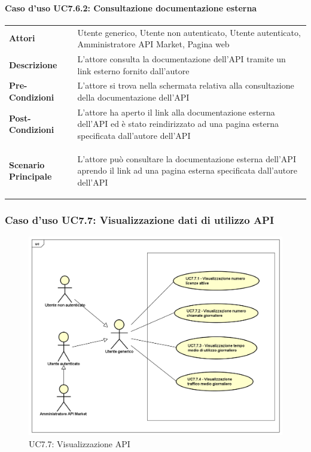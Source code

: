 \paragraph{Caso d'uso UC7.6.2: Consultazione documentazione esterna}
\label{UC7_6_2}

\begin{minipage}{\linewidth}
	\begin{tabular}{ l | p{11cm}}
		\hline
		\rowcolor{Gray}
		\multicolumn{2}{c}{UC7.6.2 - Consultazione documentazione esterna} \\
		\hline
		\textbf{Attori} & Utente generico, Utente non autenticato, Utente autenticato, Amministratore API Market, Pagina web \\
		\textbf{Descrizione} & L'attore consulta la documentazione dell'API tramite un link esterno fornito dall'autore \\
		\textbf{Pre-Condizioni} & L'attore si trova nella schermata relativa alla consultazione della documentazione dell'API \\
		\textbf{Post-Condizioni} & L'attore ha aperto il link alla documentazione esterna dell'API ed è stato reindirizzato ad una pagina esterna specificata dall'autore dell'API \\
		\textbf{Scenario Principale} & 
		\begin{enumerate*}[label=(\arabic*.),itemjoin={\newline}]
			\item L'attore può consultare la documentazione esterna dell'API aprendo il link ad una pagina esterna specificata dall'autore dell'API
		\end{enumerate*}\\
	\end{tabular}
\end{minipage}

\newpage
\subsubsection{Caso d'uso UC7.7: Visualizzazione dati di utilizzo API}
\label{UC7_7}
\begin{figure}[ht]
	\centering
	\includegraphics[scale=0.45]{UML/UC7_7.png}
	\caption{UC7.7: Visualizzazione API}
\end{figure}

